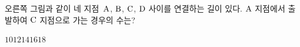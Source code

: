 \hspace*{2mm}\begin{minipage}[t]{\dimexpr\linewidth-2mm\relax}\vspace{0pt}
\noindent\begin{minipage}[t]{0.58\linewidth}\vspace{0pt}\raggedright 오른쪽 그림과 같이 네 지점~$\mathrm{A}$, $\mathrm{B}$, $\mathrm{C}$, $\mathrm{D}$ 사이를 연결하는 길이 있다. $\mathrm{A}$ 지점에서 출발하여 $\mathrm{C}$ 지점으로 가는 경우의 수는? \end{minipage}\hfill\begin{minipage}[t]{0.4\linewidth}\vspace{0pt}\centering \resizebox{\ifdim\width>\linewidth\linewidth\else\width\fi}{!}{}\end{minipage}\par
\begin{choices32}{$10$}{$12$}{$14$}{$16$}{$18$}\end{choices32}\end{minipage}
